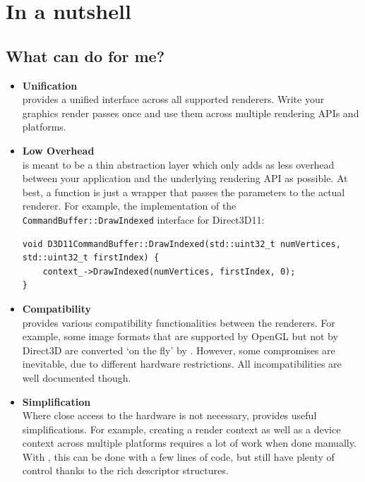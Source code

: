 \documentclass{article}
\begin{document}
\section{In a nutshell}

\subsection{What can \LLGL do for me?}

\begin{itemize}
	\item \textbf{Unification} \\
	\LLGL provides a unified interface across all supported renderers.
	Write your graphics render passes once and use them across multiple rendering APIs and platforms.
	
	\item \textbf{Low Overhead} \\
	\LLGL is meant to be a thin abstraction layer which only adds as less overhead between your application and the underlying rendering API as possible.
	At best, a function is just a wrapper that passes the parameters to the actual renderer.
	For example, the implementation of the \texttt{CommandBuffer::DrawIndexed} interface for Direct3D11:
\begin{lstlisting}
void D3D11CommandBuffer::DrawIndexed(std::uint32_t numVertices, std::uint32_t firstIndex) {
    context_->DrawIndexed(numVertices, firstIndex, 0);
}
\end{lstlisting}
	
	\item \textbf{Compatibility} \\
	\LLGL provides various compatibility functionalities between the renderers.
	For example, some image formats that are supported by OpenGL but not by Direct3D are converted `on the fly' by \LLGL.
	However, some compromises are inevitable, due to different hardware restrictions.
	All incompatibilities are well documented though.
	
	\item \textbf{Simplification} \\
	Where close access to the hardware is not necessary, \LLGL provides useful simplifications.
	For example, creating a render context as well as a device context across multiple platforms requires a lot of work when done manually.
	With \LLGL, this can be done with a few lines of code, but still have plenty of control thanks to the rich descriptor structures.
\end{itemize}
\end{document}
